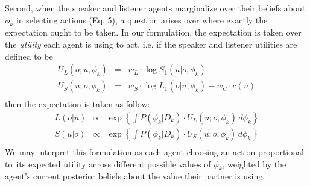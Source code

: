 \documentclass[11pt, floatsintext]{apa6}
\begin{document}
Second, when the speaker and listener agents marginalize over their beliefs about $\phi_k$ in selecting actions (Eq. 5), a question arises over where exactly the expectation ought to be taken. 
In our formulation, the expectation is taken over the \emph{utility} each agent is using to act, i.e. if the speaker and listener utilities are defined to be 
$$
\begin{array}{rcl}
U_L(o;u, \phi_k) & = & w_L \cdot \log S_1(u|o, \phi_k)\\
U_S(u;o, \phi_k) & = & w_S \cdot \log L_1(o|u, \phi_k) - w_C \cdot c(u) \\
\end{array}
$$
then the expectation is taken as follow:
$$
\begin{array}{rcl}
L(o|u) & \propto & \exp\left\{\int P(\phi_k |D_k)\cdot U_L(u; o, \phi_k) \, d \phi_k\right\}\\
S(u|o) & \propto & \exp\left\{\int P(\phi_k | D_k) \cdot U_S(u; o, \phi_k) \, d \phi_k\right\} \\
\end{array}
$$
We may interpret this formulation as each agent choosing an action proportional to its expected utility across different possible values of $\phi_k$, weighted by the agent's current posterior beliefs about the value their partner is using.
\end{document}
